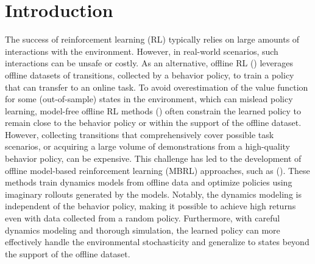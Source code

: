 \section{Introduction}

The success of reinforcement learning (RL) typically relies on large amounts of interactions with the environment. However, in real-world scenarios, such interactions can be unsafe or costly. As an alternative, offline RL (\cite{DBLP:journals/corr/abs-2005-01643}) leverages offline datasets of transitions, collected by a behavior policy, to train a policy that can transfer to an online task. To avoid overestimation of the value function for some (out-of-sample) states in the environment, which can mislead policy learning, model-free offline RL methods (\cite{DBLP:conf/nips/KumarZTL20, DBLP:journals/corr/abs-1911-11361}) often constrain the learned policy to remain close to the behavior policy or within the support of the offline dataset. However, collecting transitions that comprehensively cover possible task scenarios, or acquiring a large volume of demonstrations from a high-quality behavior policy, can be expensive. This challenge has led to the development of offline model-based reinforcement learning (MBRL) approaches, such as  (\cite{DBLP:conf/iclr/LuBPOR22, DBLP:conf/nips/GuoSG22}). These methods train dynamics models from offline data and optimize policies using imaginary rollouts generated by the models. Notably, the dynamics modeling is independent of the behavior policy, making it possible to achieve high returns even with data collected from a random policy. Furthermore, with careful dynamics modeling and thorough simulation, the learned policy can more effectively handle the environmental stochasticity and generalize to states beyond the support of the offline dataset.

